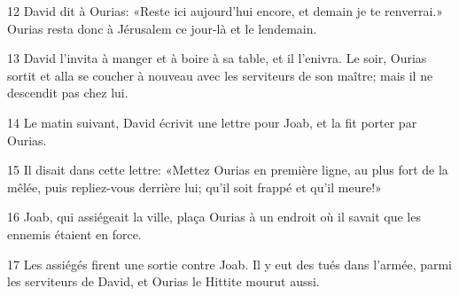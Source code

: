
12 David dit à Ourias: «Reste ici aujourd’hui encore, et demain je te renverrai.» Ourias resta donc à Jérusalem ce jour-là et le lendemain.

13 David l’invita à manger et à boire à sa table, et il l’enivra. Le soir, Ourias sortit et alla se coucher à nouveau avec les serviteurs de son maître; mais il ne descendit pas chez lui.

14 Le matin suivant, David écrivit une lettre pour Joab, et la fit porter par Ourias.

15 Il disait dans cette lettre: «Mettez Ourias en première ligne, au plus fort de la mêlée, puis repliez-vous derrière lui; qu’il soit frappé et qu’il meure!»

16 Joab, qui assiégeait la ville, plaça Ourias à un endroit où il savait que les ennemis étaient en force.

17 Les assiégés firent une sortie contre Joab. Il y eut des tués dans l’armée, parmi les serviteurs de David, et Ourias le Hittite mourut aussi.